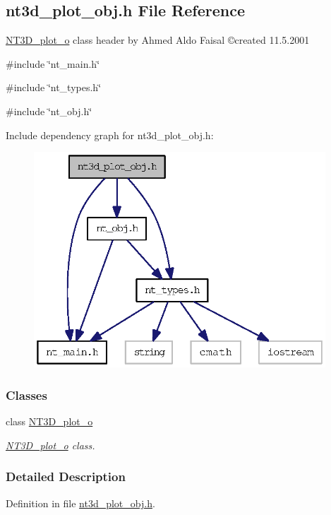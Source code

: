 \subsection{nt3d\_\-plot\_\-obj.h File Reference}
\label{nt3d__plot__obj_8h}



\begin{DoxyItemize}
\item \hyperlink{class_n_t3_d__plot__o}{NT3D\_\-plot\_\-o} class header by Ahmed Aldo Faisal \copyright created 11.5.2001 
\end{DoxyItemize} 


{\ttfamily \#include \char`\"{}nt\_\-main.h\char`\"{}}\par
{\ttfamily \#include \char`\"{}nt\_\-types.h\char`\"{}}\par
{\ttfamily \#include \char`\"{}nt\_\-obj.h\char`\"{}}\par
Include dependency graph for nt3d\_\-plot\_\-obj.h:
\nopagebreak
\begin{figure}[H]
\begin{center}
\leavevmode
\includegraphics[width=310pt]{nt3d__plot__obj_8h__incl}
\end{center}
\end{figure}
\subsubsection*{Classes}
\begin{DoxyCompactItemize}
\item 
class \hyperlink{class_n_t3_d__plot__o}{NT3D\_\-plot\_\-o}
\begin{DoxyCompactList}\small\item\em \hyperlink{class_n_t3_d__plot__o}{NT3D\_\-plot\_\-o} class. \item\end{DoxyCompactList}\end{DoxyCompactItemize}


\subsubsection{Detailed Description}


Definition in file \hyperlink{nt3d__plot__obj_8h_source}{nt3d\_\-plot\_\-obj.h}.

